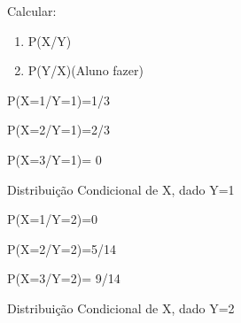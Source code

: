 \documentclass[a4paper,12pt]{report}
\begin{document}
{Calcular: \vskip0.3cm

\begin{enumerate}
    \item  P(X/Y)
    \item  P(Y/X)(Aluno fazer)
\end{enumerate}

\par P(X=1/Y=1)=1/3 \\
\par P(X=2/Y=1)=2/3 \\
\par P(X=3/Y=1)= 0

\vskip0.3cm

Distribuição Condicional de X, dado Y=1

\begin{table}[!htb]
\end{table}


\newpage

\par P(X=1/Y=2)=0 \\
\par P(X=2/Y=2)=5/14 \\
\par P(X=3/Y=2)= 9/14

\vskip0.3cm

Distribuição Condicional de X, dado Y=2

\begin{table}[!htb]
\end{table}

}
\end{document}
